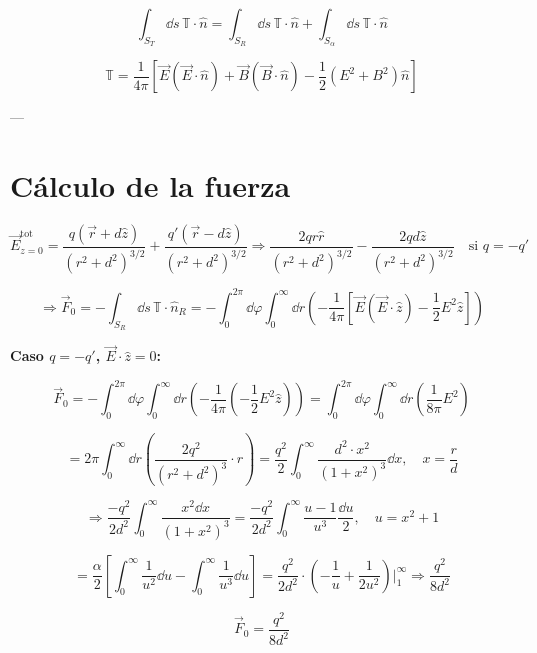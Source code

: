 \documentclass[12pt]{article}
\begin{document}
\[
\int_{S_T} \dd{s} \, \mathbb{T} \cdot \hat{n} = \int_{S_R} \dd{s} \, \mathbb{T} \cdot \hat{n} + \int_{S_\alpha} \dd{s} \, \mathbb{T} \cdot \hat{n}
\]

\[
\mathbb{T} = \frac{1}{4\pi} \left[ \vec{E} (\vec{E} \cdot \hat{n}) + \vec{B} (\vec{B} \cdot \hat{n}) - \frac{1}{2}(E^2 + B^2) \hat{n} \right]
\]

---

\section*{Cálculo de la fuerza}

\[
\vec{E}^{\text{tot}}_{z=0} = \frac{q (\vec{r} + d \hat{z})}{(r^2 + d^2)^{3/2}} + \frac{q' (\vec{r} - d \hat{z})}{(r^2 + d^2)^{3/2}}
\Rightarrow \frac{2 q r \hat{r}}{(r^2 + d^2)^{3/2}} - \frac{2 q d \hat{z}}{(r^2 + d^2)^{3/2}}
\quad \text{si } q = -q'
\]

\[
\Rightarrow \vec{F}_0 = - \int_{S_R} \dd{s} \, \mathbb{T} \cdot \hat{n}_R = - \int_0^{2\pi} \dd{\varphi} \int_0^\infty \dd{r} \left( - \frac{1}{4\pi} \left[ \vec{E} (\vec{E} \cdot \hat{z}) - \frac{1}{2} E^2 \hat{z} \right] \right)
\]

\textbf{Caso \( q = -q' \), \( \vec{E} \cdot \hat{z} = 0 \):}

\[
\vec{F}_0 = - \int_0^{2\pi} \dd{\varphi} \int_0^\infty \dd{r} \left( - \frac{1}{4\pi} \left( - \frac{1}{2} E^2 \hat{z} \right) \right)
= \int_0^{2\pi} \dd{\varphi} \int_0^\infty \dd{r} \left( \frac{1}{8\pi} E^2 \right)
\]

\[
= 2\pi \int_0^\infty \dd{r} \left( \frac{2 q^2}{(r^2 + d^2)^3} \cdot r \right)
= \frac{q^2}{2} \int_0^\infty \frac{d^2 \cdot x^2}{(1 + x^2)^3} \dd{x}, \quad x = \frac{r}{d}
\]

\[
\Rightarrow \frac{-q^2}{2 d^2} \int_0^\infty \frac{x^2 \dd{x}}{(1 + x^2)^3}
= \frac{-q^2}{2 d^2} \int_0^\infty \frac{u - 1}{u^3} \frac{\dd{u}}{2}, \quad u = x^2 + 1
\]

\[
= \frac{\alpha}{2} \left[ \int_0^\infty \frac{1}{u^2} \dd{u} - \int_0^\infty \frac{1}{u^3} \dd{u} \right]
= \frac{q^2}{2 d^2} \cdot \left( -\frac{1}{u} + \frac{1}{2 u^2} \right) \bigg|_1^\infty
\Rightarrow \frac{q^2}{8 d^2}
\]

\[
\boxed{\vec{F}_0 = \frac{q^2}{8 d^2}}
\]
\end{document}
